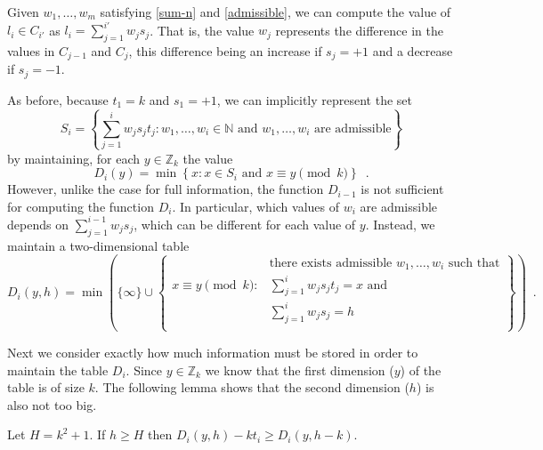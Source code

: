 \documentclass[11pt,a4paper]{article}
\newcommand{\Z}{\mathbb{Z}}
\begin{document}
Given $w_1,\ldots,w_m$ satisfying \eqref{sum-n} and
\eqref{admissible}, we can compute the value of $l_i\in C_{i'}$ as 
$l_i =\sum_{j=1}^{i'} w_js_j$.  That is, the value $w_j$ represents the
difference in the values in $C_{j-1}$ and $C_j$, this difference being
an increase if $s_j=+1$ and a decrease if $s_j=-1$.

As before, because $t_1=k$ and $s_1=+1$, we can implicitly represent
the set 
\[
   S_i = \left\{\sum_{j=1}^i w_js_jt_j : 
	\mbox{$w_1,\ldots,w_i\in\mathbb{N}$ and  
		$w_1,\ldots,w_i$ are admissible} \right\}
\]
by maintaining, for each $y\in \Z_k$ the value 
\[
   D_i(y) = \min\left\{x : \mbox{$x\in S_i$ and $x\equiv y\pmod{k}$} \right\}
    \enspace .
\]
However, unlike the case for full information, the function $D_{i-1}$
is not sufficient for computing the function $D_{i}$.  In particular,
which values of $w_i$ are admissible depends on
$\sum_{j=1}^{i-1}w_js_j$, which can be different for each value of $y$.
Instead, we maintain a two-dimensional table
\[
   D_i(y,h) = \min\left(\{\infty\}\cup \left\{
    \begin{array}{ll}
          & \mbox{there exists admissible $w_1,\ldots,w_i$ such that} \\
        \mbox{$x\equiv y\pmod{k}$} : & \mbox{$\sum_{j=1}^i w_js_jt_j = x$ and} \\
          & \mbox{$\sum_{j=1}^i w_js_j = h$} \\
          
    \end{array}
    \right\}\right)
    \enspace .
\]

Next we consider exactly how much information must be stored in order
to maintain the table $D_i$. Since $y\in \mathbb{Z}_k$ we know that
the first dimension ($y$) of the table is of size $k$. The following
lemma shows that the second dimension ($h$) is also not too big.

\begin{lem}
Let $H=k^2+1$.  If $h\ge H$ then $D_i(y,h) - kt_i \ge D_i(y,h-k)$.
\end{lem}
\end{document}

